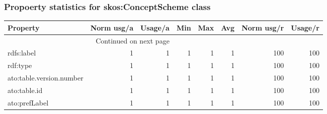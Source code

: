 \documentclass[10pt,a4paper,titlepage,final]{article}
\begin{document}
\subsubsection{Propoerty statistics for skos:ConceptScheme class}
\begin{longtable}{lrrrrrrr}
\toprule
                 Property &  Norm usg/a &  Usage/a &  Min &  Max &  Avg &  Norm usg/r &  Usage/r \\
\midrule
\endhead
\midrule
\multicolumn{3}{r}{{Continued on next page}} \\
\midrule
\endfoot

\bottomrule
\endlastfoot
               rdfs:label &           1 &        1 &    1 &    1 &    1 &         100 &      100 \\
                 rdf:type &           1 &        1 &    1 &    1 &    1 &         100 &      100 \\
 ato:table.version.number &           1 &        1 &    1 &    1 &    1 &         100 &      100 \\
             ato:table.id &           1 &        1 &    1 &    1 &    1 &         100 &      100 \\
            ato:prefLabel &           1 &        1 &    1 &    1 &    1 &         100 &      100 \\
\end{longtable}
\end{document}
